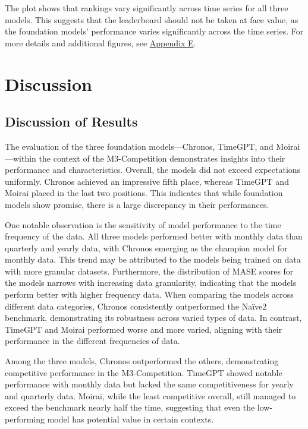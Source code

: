 \documentclass[12pt,a4paper]{article}
\begin{document}
The plot shows that rankings vary significantly across time series for all three models. This suggests that the leaderboard should not be taken at face value, as the foundation models' performance varies significantly across the time series. For more details and additional figures, see \hyperref[appendix_e]{Appendix E}.

\newpage
{\centering \section{Discussion} \par}

\subsection{Discussion of Results}

The evaluation of the three foundation models—Chronos, TimeGPT, and Moirai—within the context of the M3-Competition demonstrates insights into their performance and characteristics. Overall, the models did not exceed expectations uniformly. Chronos achieved an impressive fifth place, whereas TimeGPT and Moirai placed in the last two positions. This indicates that while foundation models show promise, there is a large discrepancy in their performances.

One notable observation is the sensitivity of model performance to the time frequency of the data. All three models performed better with monthly data than quarterly and yearly data, with Chronos emerging as the champion model for monthly data. This trend may be attributed to the models being trained on data with more granular datasets. Furthermore, the distribution of MASE scores for the models narrows with increasing data granularity, indicating that the models perform better with higher frequency data. When comparing the models across different data categories, Chronos consistently outperformed the Naïve2 benchmark, demonstrating its robustness across varied types of data. In contrast, TimeGPT and Moirai performed worse and more varied, aligning with their performance in the different frequencies of data.

Among the three models, Chronos outperformed the others, demonstrating competitive performance in the M3-Competition. TimeGPT showed notable performance with monthly data but lacked the same competitiveness for yearly and quarterly data. Moirai, while the least competitive overall, still managed to exceed the benchmark nearly half the time, suggesting that even the low-performing model has potential value in certain contexts.
\end{document}
